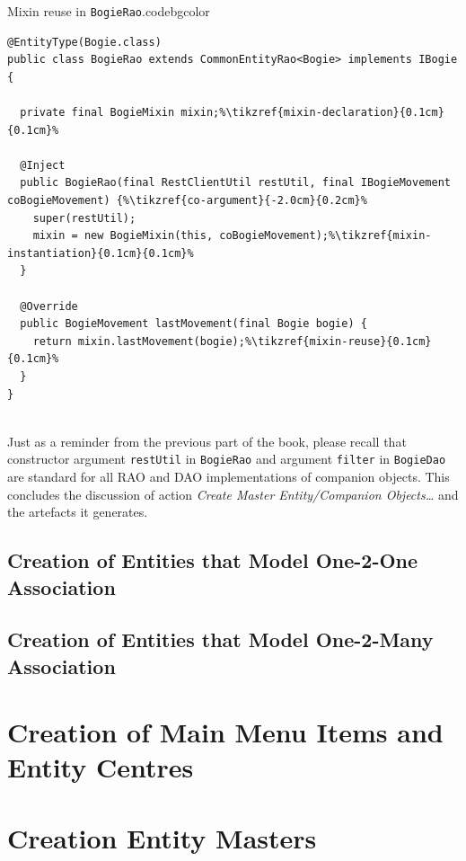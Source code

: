  \begin{code}{Mixin reuse in \texttt{BogieRao}.}{\label{lst:ch02:00:BogieRao-mixin}}{codebgcolor}
  \begin{lstlisting}
@EntityType(Bogie.class)
public class BogieRao extends CommonEntityRao<Bogie> implements IBogie {
  
  private final BogieMixin mixin;%\tikzref{mixin-declaration}{0.1cm}{0.1cm}%
  
  @Inject
  public BogieRao(final RestClientUtil restUtil, final IBogieMovement coBogieMovement) {%\tikzref{co-argument}{-2.0cm}{0.2cm}%
    super(restUtil);
    mixin = new BogieMixin(this, coBogieMovement);%\tikzref{mixin-instantiation}{0.1cm}{0.1cm}%
  }

  @Override
  public BogieMovement lastMovement(final Bogie bogie) { 
    return mixin.lastMovement(bogie);%\tikzref{mixin-reuse}{0.1cm}{0.1cm}%
  }
}
  
  \end{lstlisting}
\end{code}  

  Just as a reminder from the previous part of the book, please recall that constructor argument \texttt{restUtil} in \texttt{BogieRao} and argument \texttt{filter} in \texttt{BogieDao} are standard for all RAO and DAO implementations of companion objects.
  This concludes the discussion of action \emph{Create Master Entity/Companion Objects\ldots} and the artefacts it generates.
 
  \subsection{Creation of Entities that Model One-2-One Association}  
  
  \subsection{Creation of Entities that Model One-2-Many Association}  
  
\section{Creation of Main Menu Items and Entity Centres}  
  
  
\section{Creation Entity Masters}
  
